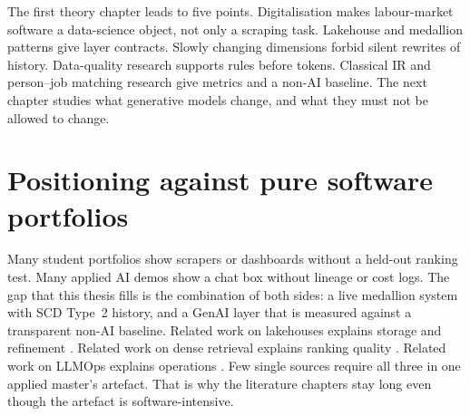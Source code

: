 The first theory chapter leads to five points. Digitalisation makes labour-market software a data-science object, not only a scraping task. Lakehouse and medallion patterns give layer contracts. Slowly changing dimensions forbid silent rewrites of history. Data-quality research supports rules before tokens. Classical IR and person--job matching research give metrics and a non-AI baseline. The next chapter studies what generative models change, and what they must not be allowed to change.

\section{Positioning against pure software portfolios}
\label{sec:portfolio-gap}

Many student portfolios show scrapers or dashboards without a held-out ranking test. Many applied AI demos show a chat box without lineage or cost logs. The gap that this thesis fills is the combination of both sides: a live medallion system with SCD Type~2 history, and a GenAI layer that is measured against a transparent non-AI baseline. Related work on lakehouses explains storage and refinement \citep{armbrust2021lakehouse}. Related work on dense retrieval explains ranking quality \citep{karpukhin2020dpr,jarvelin2002ndcg}. Related work on LLMOps explains operations \citep{kreuzberger2023mlops}. Few single sources require all three in one applied master's artefact. That is why the literature chapters stay long even though the artefact is software-intensive.

